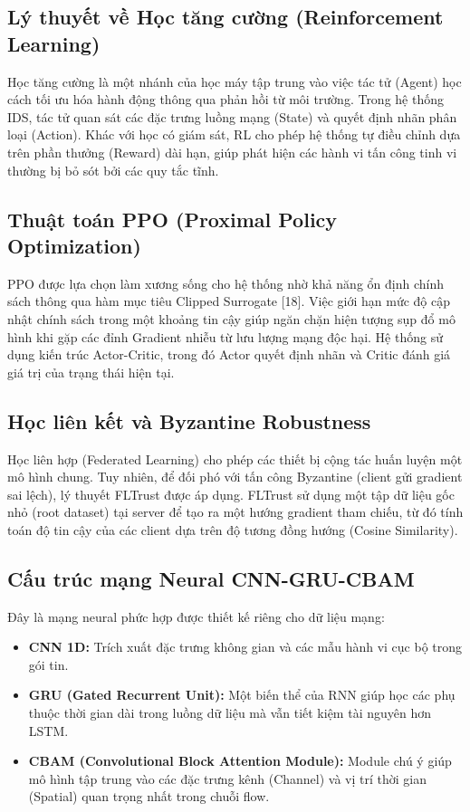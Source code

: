 \documentclass[12pt,a4paper]{article}
\begin{document}
\subsection{Lý thuyết về Học tăng cường (Reinforcement Learning)}
Học tăng cường là một nhánh của học máy tập trung vào việc tác tử (Agent) học cách tối ưu hóa hành động thông qua phản hồi từ môi trường. Trong hệ thống IDS, tác tử quan sát các đặc trưng luồng mạng (State) và quyết định nhãn phân loại (Action). Khác với học có giám sát, RL cho phép hệ thống tự điều chỉnh dựa trên phần thưởng (Reward) dài hạn, giúp phát hiện các hành vi tấn công tinh vi thường bị bỏ sót bởi các quy tắc tĩnh.

\subsection{Thuật toán PPO (Proximal Policy Optimization)}\label{sec:ppo}
PPO được lựa chọn làm xương sống cho hệ thống nhờ khả năng ổn định chính sách thông qua hàm mục tiêu Clipped Surrogate [18]. Việc giới hạn mức độ cập nhật chính sách trong một khoảng tin cậy giúp ngăn chặn hiện tượng sụp đổ mô hình khi gặp các đỉnh Gradient nhiễu từ lưu lượng mạng độc hại. Hệ thống sử dụng kiến trúc Actor-Critic, trong đó Actor quyết định nhãn và Critic đánh giá giá trị của trạng thái hiện tại.

\subsection{Học liên kết và Byzantine Robustness}
Học liên hợp (Federated Learning) cho phép các thiết bị cộng tác huấn luyện một mô hình chung. Tuy nhiên, để đối phó với tấn công Byzantine (client gửi gradient sai lệch), lý thuyết FLTrust được áp dụng. FLTrust sử dụng một tập dữ liệu gốc nhỏ (root dataset) tại server để tạo ra một hướng gradient tham chiếu, từ đó tính toán độ tin cậy của các client dựa trên độ tương đồng hướng (Cosine Similarity).

\subsection{Cấu trúc mạng Neural CNN-GRU-CBAM}
Đây là mạng neural phức hợp được thiết kế riêng cho dữ liệu mạng:
\begin{itemize}
    \item \textbf{CNN 1D:} Trích xuất đặc trưng không gian và các mẫu hành vi cục bộ trong gói tin.
    \item \textbf{GRU (Gated Recurrent Unit):} Một biến thể của RNN giúp học các phụ thuộc thời gian dài trong luồng dữ liệu mà vẫn tiết kiệm tài nguyên hơn LSTM.
    \item \textbf{CBAM (Convolutional Block Attention Module):} Module chú ý giúp mô hình tập trung vào các đặc trưng kênh (Channel) và vị trí thời gian (Spatial) quan trọng nhất trong chuỗi flow.
\end{itemize}
\end{document}
